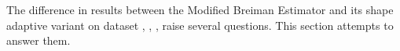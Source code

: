
The difference in results between the Modified Breiman Estimator and its shape adaptive variant on dataset \ferdosiOne, \baakmanOne, \baakmanFour, \baakmanFive raise several questions. This section attempts to answer them.



